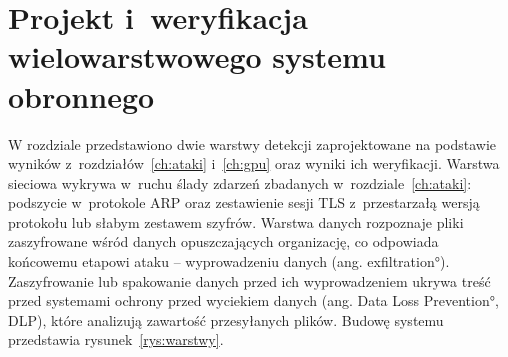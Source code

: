 \chapter{Projekt i~weryfikacja wielowarstwowego systemu obronnego}\label{ch:obrona}

W rozdziale przedstawiono dwie warstwy detekcji zaprojektowane na podstawie wyników z~rozdziałów~\ref{ch:ataki} i~\ref{ch:gpu} oraz wyniki ich weryfikacji. Warstwa sieciowa wykrywa w~ruchu ślady zdarzeń zbadanych w~rozdziale~\ref{ch:ataki}: podszycie w~protokole ARP oraz zestawienie sesji TLS z~przestarzałą wersją protokołu lub słabym zestawem szyfrów. Warstwa danych rozpoznaje pliki zaszyfrowane wśród danych opuszczających organizację, co odpowiada końcowemu etapowi ataku -- wyprowadzeniu danych (ang. \ang{exfiltration}). Zaszyfrowanie lub spakowanie danych przed ich wyprowadzeniem ukrywa treść przed systemami ochrony przed wyciekiem danych (ang. \ang{Data Loss Prevention}, DLP), które analizują zawartość przesyłanych plików. Budowę systemu przedstawia rysunek~\ref{rys:warstwy}.


